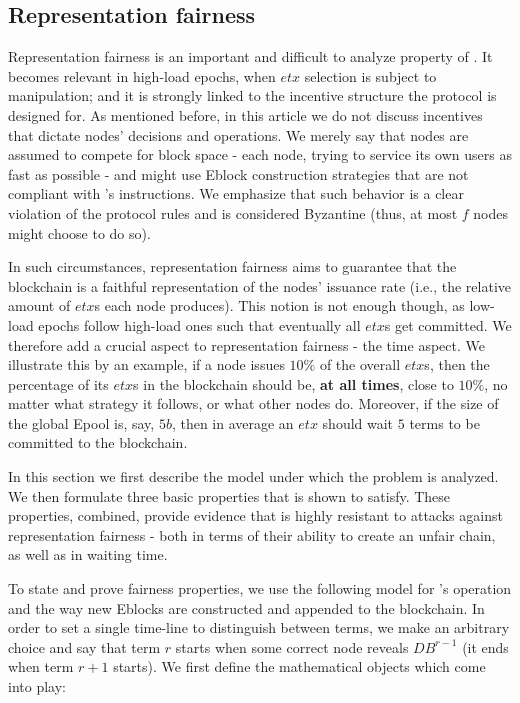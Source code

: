 \subsection{Representation fairness}\label{subsec:repfair}
Representation fairness is an important and difficult to analyze property of \nameNS. It becomes relevant in high-load epochs, when $etx$ selection is subject to manipulation; and it is strongly linked to the incentive structure the protocol is designed for. As mentioned before, in this article we do not discuss incentives that dictate nodes' decisions and operations. We merely say that nodes are assumed to compete for block space - each node, trying to service its own users as fast as possible - and might use Eblock construction strategies that are not compliant with \nameNS's instructions. We emphasize that such behavior is a clear violation of the protocol rules and is considered Byzantine (thus, at most $f$ nodes might choose to do so).

In such circumstances, representation fairness aims to guarantee that the blockchain is a faithful representation of the nodes' issuance rate (i.e., the relative amount of $etx$s each node produces). This notion is not enough though, as low-load epochs follow high-load ones such that eventually all $etx$s get committed. We therefore add a crucial aspect to representation fairness - the time aspect. We illustrate this by an example, if a node issues $10\%$ of the overall $etx$s, then the percentage of its $etx$s in the blockchain should be, \textbf{at all times}, close to $10\%$, no matter what strategy it follows, or what other nodes do. Moreover, if the size of the global Epool is, say, $5b$, then in average an $etx$ should wait $5$ terms to be committed to the blockchain.

In this section we first describe the model under which the problem is analyzed. We then formulate three basic properties that \name is shown to satisfy. These properties, combined, provide evidence that \name is highly resistant to attacks against representation fairness - both in terms of their ability to create an unfair chain, as well as in waiting time. 

To state and prove fairness properties, we use the following model for \nameNS's operation and the way new Eblocks are constructed and appended to the blockchain. In order to set a single time-line to distinguish between terms, we make an arbitrary choice and say that term $r$ starts when some correct node reveals $DB^{r-1}$ (it ends when term $r+1$ starts). We first define the mathematical objects which come into play: 

